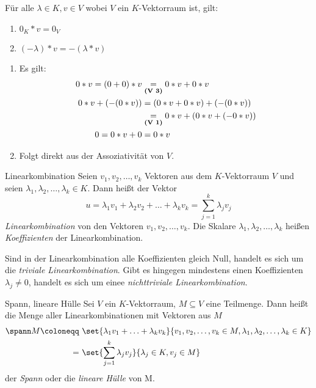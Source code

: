 \begin{lemma}{}
  Für alle $\lambda \in K, v\in V$ wobei $V$ ein $K$-Vektorraum ist, gilt:
  \begin{enumerate}
    \item $0_K* v = 0_V$
    \item $(-\lambda)* v = -(\lambda* v)$
  \end{enumerate}
\end{lemma}
\beweis
\begin{enumerate}
  \item Es gilt:
  \begin{align*}
    0* v = (0+0)* v &\underset{\text{\textbf{(V 3)}}}{=}0* v+ 0* v\\
    0* v + (-(0* v)) &=(0* v + 0* v)+(-(0*v))\\
    &\underset{\text{\textbf{(V 1)}}}{=} 0*v+(0*v+(-0*v))\\
    0=0*v +0&=0*v
  \end{align*}
  \item Folgt direkt aus der Assoziativität von $V$.
\end{enumerate}

\begin{definition}{Linearkombination}
	Seien $v_1,v_2,\ldots,v_k$ Vektoren aus dem $K$-Vektorraum $V$ und seien $\lambda_1,\lambda_2,\ldots,\lambda_k \in K$. Dann heißt der Vektor
	\begin{equation*}
	  u=\lambda_1v_1+\lambda_2v_2+\ldots+\lambda_kv_k = \sum\limits_{j=1}^k\lambda_jv_j
	\end{equation*}
	\emph{Linearkombination} von den Vektoren $v_1,v_2,\ldots,v_k$.
	Die Skalare $\lambda_1,\lambda_2,\ldots,\lambda_k$ heißen \emph{Koeffizienten} der Linearkombination.

	Sind in der Linearkombination alle Koeffizienten gleich Null, handelt es sich um die \emph{triviale Linearkombination}. Gibt es hingegen mindestens einen Koeffizienten $\lambda_j \neq 0$, handelt es sich um einee \emph{nichttriviale Linearkombination}.
\end{definition}

\begin{definition}{Spann, lineare Hülle}
	Sei $V$ ein $K$-Vektorraum, $M\subseteq V$ eine Teilmenge. Dann heißt die Menge aller Linearkombinationen mit Vektoren aus $M$
	\begin{align*}
	  \spann M\coloneqq&\  \set{\lambda_1v_1+\ldots+\lambda_kv_k}{v_1,v_2,\ldots,v_k \in M, \lambda_1,\lambda_2,\ldots,\lambda_k \in K}\\
	  =&\ \set{\sum\limits_{j=1}^k\lambda_jv_j}{\lambda_j \in K, v_j\in M}
	\end{align*}
	der \emph{Spann} oder die \emph{lineare Hülle} von M.
\end{definition}

